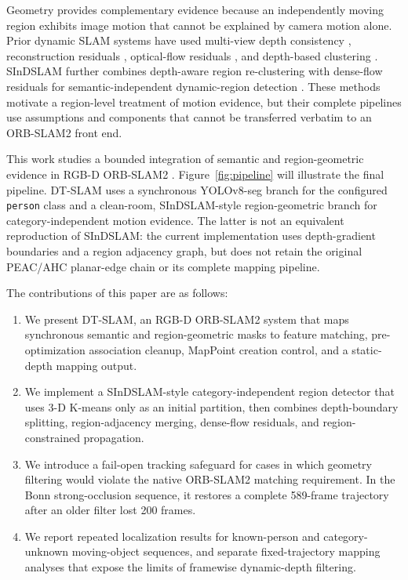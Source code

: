 \documentclass[10pt]{article}
\begin{document}
Geometry provides complementary evidence because an independently moving region exhibits image motion that cannot be explained by camera motion alone. Prior dynamic SLAM systems have used multi-view depth consistency \citep{dynaslam}, reconstruction residuals \citep{refusion,detectfusion}, optical-flow residuals \citep{flowfusion}, and depth-based clustering \citep{ji2021}. SInDSLAM further combines depth-aware region re-clustering with dense-flow residuals for semantic-independent dynamic-region detection \citep{sindslam}. These methods motivate a region-level treatment of motion evidence, but their complete pipelines use assumptions and components that cannot be transferred verbatim to an ORB-SLAM2 front end.

This work studies a bounded integration of semantic and region-geometric evidence in RGB-D ORB-SLAM2 \citep{orbslam2}. Figure~\ref{fig:pipeline} will illustrate the final pipeline. DT-SLAM uses a synchronous YOLOv8-seg branch for the configured \texttt{person} class and a clean-room, SInDSLAM-style region-geometric branch for category-independent motion evidence. The latter is not an equivalent reproduction of SInDSLAM: the current implementation uses depth-gradient boundaries and a region adjacency graph, but does not retain the original PEAC/AHC planar-edge chain or its complete mapping pipeline.

The contributions of this paper are as follows:
\begin{enumerate}[leftmargin=*]
  \item We present DT-SLAM, an RGB-D ORB-SLAM2 system that maps synchronous semantic and region-geometric masks to feature matching, pre-optimization association cleanup, MapPoint creation control, and a static-depth mapping output.
  \item We implement a SInDSLAM-style category-independent region detector that uses 3-D K-means only as an initial partition, then combines depth-boundary splitting, region-adjacency merging, dense-flow residuals, and region-constrained propagation.
  \item We introduce a fail-open tracking safeguard for cases in which geometry filtering would violate the native ORB-SLAM2 matching requirement. In the Bonn strong-occlusion sequence, it restores a complete 589-frame trajectory after an older filter lost 200 frames.
  \item We report repeated localization results for known-person and category-unknown moving-object sequences, and separate fixed-trajectory mapping analyses that expose the limits of framewise dynamic-depth filtering.
\end{enumerate}
\end{document}
